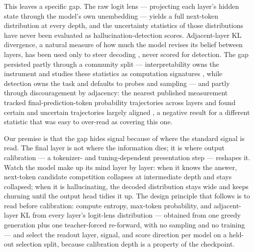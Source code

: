 This leaves a specific gap. The raw logit lens --- projecting each layer's hidden state through the model's own unembedding --- yields a full next-token distribution at every depth, and the uncertainty statistics of those distributions have never been evaluated as hallucination-detection scores. Adjacent-layer KL divergence, a natural measure of how much the model revises its belief between layers, has been used only to steer decoding \citep{Chuang2023DoLa,Wu2025Improve}, never scored for detection. The gap persisted partly through a community split --- interpretability owns the instrument and studies these statistics as computation signatures \citep{Ali2025Entropy}, while detection owns the task and defaults to probes and sampling --- and partly through discouragement by adjacency: the nearest published measurement tracked final-prediction-token probability trajectories across layers and found certain and uncertain trajectories largely aligned \citep{Kim2025Effect}, a negative result for a different statistic that was easy to over-read as covering this one.

Our premise is that the gap hides signal because of where the standard signal is read. The final layer is not where the information dies; it is where output calibration --- a tokenizer- and tuning-dependent presentation step --- reshapes it. Watch the model make up its mind layer by layer: when it knows the answer, next-token candidate competition collapses at intermediate depth and stays collapsed; when it is hallucinating, the decoded distribution stays wide and keeps churning until the output head tidies it up. The design principle that follows is to read before calibration: compute entropy, max-token probability, and adjacent-layer KL from every layer's logit-lens distribution --- obtained from one greedy generation plus one teacher-forced re-forward, with no sampling and no training --- and select the readout layer, signal, and score direction per model on a held-out selection split, because calibration depth is a property of the checkpoint.

